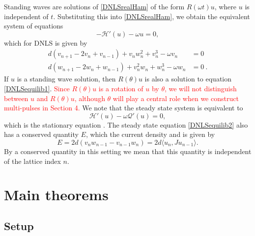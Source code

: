 \documentclass[12pt]{elsarticle}
\newcommand{\revised}[1]{ \textcolor{red}{#1} }
\begin{document}
Standing waves are solutions of \cref{DNLSrealHam} of the form $R(\omega t) u$, where $u$ is independent of $t$. Substituting this into \cref{DNLSrealHam}, we obtain the equivalent system of equations
\begin{equation}\label{DNLSequilib1}
-\mathcal{H}'(u) - \omega u = 0,
\end{equation}
which for DNLS is given by
\begin{equation}\label{DNLSequilib2}
\begin{aligned}
d (v_{n+1} - 2 v_n + v_{n-1}) + v_n w_n^2 + v_n^3 - \omega v_n &= 0 \\
d (w_{n+1} - 2 w_n + w_{n-1}) + v_n^2 w_n + w_n^3 - \omega w_n &= 0 \:.
\end{aligned} 
\end{equation}
If $u$ is a standing wave solution, then $R(\theta) u$ is also a solution to equation \eqref{DNLSequilib1}. \revised{ Since $R(\theta) u$ is a rotation of $u$ by $\theta$, we will not distinguish between $u$ and $R(\theta) u$, although $\theta$ will play a central role when we construct multi-pulses in Section 4.} We note that the steady state system is equivalent to
\begin{equation}
\mathcal{H}'(u) - \omega \mathcal{Q}'(u) = 0,
\end{equation}
which is the stationary equation \cite[(2.15)]{Grillakis1987}. The steady state equation \cref{DNLSequilib2} also has a conserved quantity $E$, which the current density \cite[(6)]{Johansson2000} and is given by
\begin{equation}\label{DNLSE}
E = 2d(v_n w_{n-1} - v_{n-1} w_n) = 2d \langle u_n, J u_{n-1} \rangle.
\end{equation}
By a conserved quantity in this setting we mean
that this quantity is independent of the lattice
index $n$.

\section{Main theorems}

\subsection{Setup}
\end{document}
